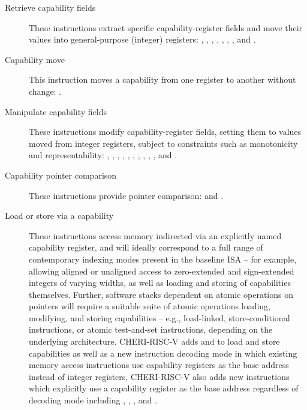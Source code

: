 \begin{description}
\item[Retrieve capability fields]
These instructions extract specific capability-register fields and move their
values into general-purpose (integer) registers:
, , ,
, , ,
, and .

\item[Capability move]
This instruction moves a capability from one register to another without
change: .

\item[Manipulate capability fields]
These instructions modify capability-register fields, setting them to values
moved from integer registers, subject to constraints such as monotonicity and
representability: , ,
, ,
, ,
, ,
, , and
.

\item[Capability pointer comparison]
These instructions provide pointer comparison:
 and
.

\item[Load or store via a capability]
These instructions access memory indirected via an explicitly named capability
register, and will ideally correspond to a full range of contemporary
indexing modes present in the baseline ISA -- for example, allowing aligned or
unaligned access to zero-extended and sign-extended integers of varying
widths, as well as loading and storing of capabilities themselves.
Further, software stacks dependent on atomic operations on pointers will
require a suitable suite of atomic operations loading, modifying, and storing
capabilities -- e.g., load-linked, store-conditional instructions, or atomic
test-and-set instructions, depending on the underlying architecture.
CHERI-RISC-V adds  and  to load and store
capabilities as well as a new instruction decoding mode in which existing
memory access instructions use capability registers as the base
address instead of integer registers.  CHERI-RISC-V also adds new
instructions which explicitly use a capability register as the base
address regardless of decoding mode including
, ,
, and .


\end{description}
